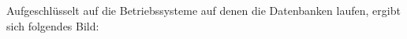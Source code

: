 \begin{flushleft}
    Aufgeschlüsselt auf die Betriebssysteme auf denen die Datenbanken laufen, ergibt sich folgendes Bild:

\end{flushleft}
